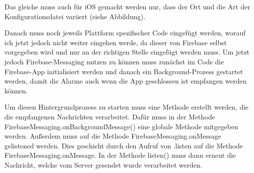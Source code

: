 Das gleiche muss auch für iOS gemacht werden nur, dass der Ort und die Art der Konfigurationsdatei
variiert (siehe Abbildung).

Danach muss noch jeweils Plattform spezifischer Code eingefügt werden, worauf ich jetzt jedoch nicht weiter 
eingehen werde, da dieser von Firebase selbst vorgegeben wird und nur an der richtigen Stelle eingefügt 
werden muss.
Um jetzt jedoch Firebase-Messaging nutzen zu können muss zunächst im Code die Firebase-App initialisiert werden 
und danach ein Background-Prozess gestartet werden, damit die Alarme auch wenn die App geschlossen ist empfangen 
werden können.

Um diesen Hintergrundprozess zu starten muss eine Methode erstellt werden, die die empfangenen Nachrichten 
verarbeitet. Dafür muss in der Methode FirebaseMessaging.onBackgroundMessage() eine globale Methode mitgegeben 
werden. Außerdem muss auf die Methode FirebaseMessaging.onMessage gelistened werden. Dies geschieht durch den Aufruf 
von \glqq .listen\grqq{} auf die Methode FirebaseMessaging.onMessage. In der Methode listen() muss dann erneut die 
Nachricht, welche vom Server gesendet wurde verarbeitet werden.